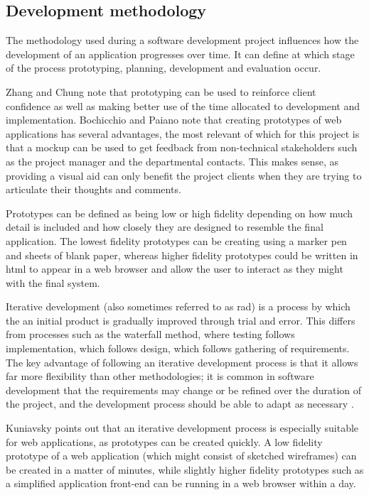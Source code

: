 
\subsection{Development methodology}

The methodology used during a software development project influences how the
development of an application progresses over time. It can define at which
stage of the process prototyping, planning, development and evaluation occur.


Zhang and Chung \cite{MODFM_2003} note that prototyping can be used to
reinforce client confidence as well as making better use of the time allocated
to development and implementation. Bochicchio and Paiano
\cite{PrototypingWebApplications_2000} note that creating prototypes of web
applications has several advantages, the most relevant of which for this
project is that a mockup can be used to get feedback from non-technical
stakeholders such as the project manager and the departmental contacts. This
makes sense, as providing a visual aid can only benefit the project clients
when they are trying to articulate their thoughts and comments.

Prototypes can be defined as being low or high fidelity depending on how much
detail is included and how closely they are designed to resemble the final
application. The lowest fidelity prototypes can be creating using a marker pen
and sheets of blank paper, whereas higher fidelity prototypes could be written
in \gls{html} to appear in a web browser and allow the user to interact as
they might with the final system.


Iterative development (also sometimes referred to as \gls{rad}) is a process
by which the an initial product is gradually improved through trial and error.
This differs from processes such as the waterfall method, where testing
follows implementation, which follows design, which follows gathering of
requirements. The key advantage of following an iterative development process
is that it allows far more flexibility than other methodologies; it is common
in software development that the requirements may change or be refined over
the duration of the project, and the development process should be able to
adapt as necessary \cite{kuniavsky2003userexperience}.

Kuniavsky points out that an iterative development process is especially
suitable for web applications, as prototypes can be created quickly. A low
fidelity prototype of a web application (which might consist of sketched
wireframes) can be created in a matter of minutes, while slightly higher
fidelity prototypes such as a simplified application front-end can be running
in a web browser within a day.

